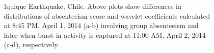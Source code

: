\documentclass[conference]{IEEEtran}
\begin{document}
\begin{figure}[t]
	\centering
	\hfill
	\hfill
	\hfill
	\caption{Iquique Earthquake, Chile. Above plots show differences in distributions of absenteeism score and wavelet coefficients calculated at 8:45 PM, April 1, 2014 (a-b) involving group absenteeism and later when burst in activity is captured at 11:00 AM, April 2, 2014 (c-d), respectively.}
\label{fig:case1_wavelet}
\end{figure}
\end{document}
